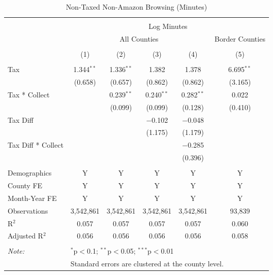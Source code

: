 
\begin{table}[!htbp] \centering 
  \caption{Non-Taxed Non-Amazon Browsing (Minutes)} 
  \label{} 
\begin{tabular}{@{\extracolsep{5pt}}lccccc} 
\\[-1.8ex]\hline 
\hline \\[-1.8ex] 
 & \multicolumn{5}{c}{Log Minutes} \\ 
\cline{2-6} 
 & \multicolumn{4}{c}{All Counties} & Border Counties \\ 
\\[-1.8ex] & (1) & (2) & (3) & (4) & (5)\\ 
\hline \\[-1.8ex] 
 Tax & 1.344$^{**}$ & 1.336$^{**}$ & 1.382 & 1.378 & 6.695$^{**}$ \\ 
  & (0.658) & (0.657) & (0.862) & (0.862) & (3.165) \\ 
  Tax * Collect &  & 0.239$^{**}$ & 0.240$^{**}$ & 0.282$^{**}$ & 0.022 \\ 
  &  & (0.099) & (0.099) & (0.128) & (0.410) \\ 
  Tax Diff &  &  & $-$0.102 & $-$0.048 &  \\ 
  &  &  & (1.175) & (1.179) &  \\ 
  Tax Diff * Collect &  &  &  & $-$0.285 &  \\ 
  &  &  &  & (0.396) &  \\ 
 \hline \\[-1.8ex] 
Demographics & Y & Y & Y & Y & Y \\ 
County FE & Y & Y & Y & Y & Y \\ 
Month-Year FE & Y & Y & Y & Y & Y \\ 
Observations & 3,542,861 & 3,542,861 & 3,542,861 & 3,542,861 & 93,839 \\ 
R$^{2}$ & 0.057 & 0.057 & 0.057 & 0.057 & 0.060 \\ 
Adjusted R$^{2}$ & 0.056 & 0.056 & 0.056 & 0.056 & 0.058 \\ 
\hline 
\hline \\[-1.8ex] 
\textit{Note:}  & \multicolumn{5}{l}{$^{*}$p$<$0.1; $^{**}$p$<$0.05; $^{***}$p$<$0.01} \\ 
 & \multicolumn{5}{l}{Standard errors are clustered at the county level.} \\ 
\end{tabular} 
\end{table} 
